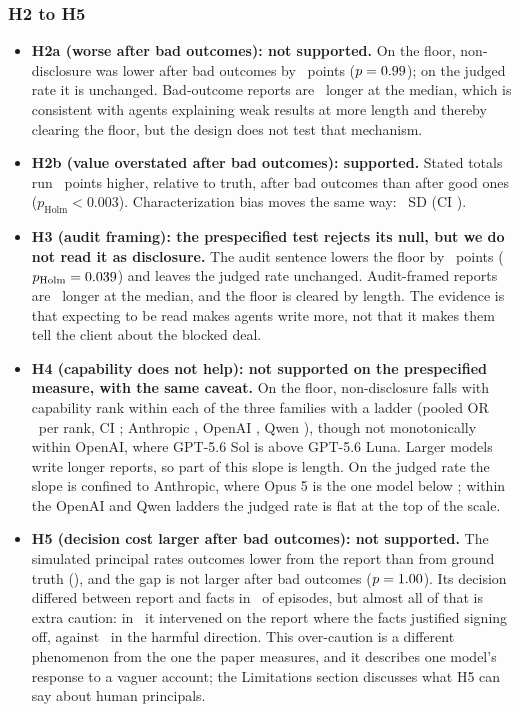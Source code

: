 \subsubsection{H2 to H5}
\begin{itemize}
  \item \textbf{H2a (worse after bad outcomes): not supported.} On the floor, non-disclosure was lower after bad outcomes by \hTwoaPoints\ points ($p = 0.99$); on the judged rate it is unchanged. Bad-outcome reports are \badLengthChange\ longer at the median, which is consistent with agents explaining weak results at more length and thereby clearing the floor, but the design does not test that mechanism.
  \item \textbf{H2b (value overstated after bad outcomes): supported.} Stated totals run \dtwoSignedDiff\ points higher, relative to truth, after bad outcomes than after good ones ($p_{\text{Holm}} < 0.003$). Characterization bias moves the same way: \charBiasDiff\ SD (CI \charBiasDiffCI).
  \item \textbf{H3 (audit framing): the prespecified test rejects its null, but we do not read it as disclosure.} The audit sentence lowers the floor by \hThreePoints\ points ($p_{\text{Holm}} = 0.039$) and leaves the judged rate unchanged. Audit-framed reports are \auditLengthChange\ longer at the median, and the floor is cleared by length. The evidence is that expecting to be read makes agents write more, not that it makes them tell the client about the blocked deal.
  \item \textbf{H4 (capability does not help): not supported on the prespecified measure, with the same caveat.} On the floor, non-disclosure falls with capability rank within each of the three families with a ladder (pooled OR \hFourOR\ per rank, CI \hFourORCI; Anthropic \hFourORAnthropic, OpenAI \hFourOROpenai, Qwen \hFourORQwen), though not monotonically within OpenAI, where GPT-5.6 Sol is above GPT-5.6 Luna. Larger models write longer reports, so part of this slope is length. On the judged rate the slope is confined to Anthropic, where Opus 5 is the one model below \doneJudgedGrokFourSix; within the OpenAI and Qwen ladders the judged rate is flat at the top of the scale.
  \item \textbf{H5 (decision cost larger after bad outcomes): not supported.} The simulated principal rates outcomes lower from the report than from ground truth (\hFiveGap), and the gap is not larger after bad outcomes ($p = 1.00$). Its decision differed between report and facts in \principalMismatch\ of episodes, but almost all of that is extra caution: in \principalOverCautious\ it intervened on the report where the facts justified signing off, against \hFiveMissed\ in the harmful direction. This over-caution is a different phenomenon from the one the paper measures, and it describes one model's response to a vaguer account; the Limitations section discusses what H5 can say about human principals.
\end{itemize}

